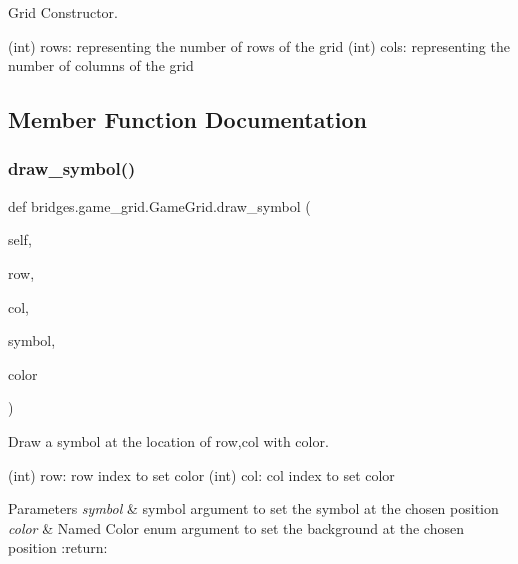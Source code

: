 Grid Constructor. 

(int) rows\+: representing the number of rows of the grid (int) cols\+: representing the number of columns of the grid 

\subsection{Member Function Documentation}
\mbox{\label{classbridges_1_1game__grid_1_1_game_grid_aa7ce48d090d75c8022a8356aafad303f}} 
\subsubsection{\texorpdfstring{draw\+\_\+symbol()}{draw\_symbol()}}
{\footnotesize\ttfamily def bridges.\+game\+\_\+grid.\+Game\+Grid.\+draw\+\_\+symbol (\begin{DoxyParamCaption}\item[{}]{self,  }\item[{}]{row,  }\item[{}]{col,  }\item[{}]{symbol,  }\item[{}]{color }\end{DoxyParamCaption})}



Draw a symbol at the location of row,col with color. 

(int) row\+: row index to set color (int) col\+: col index to set color 
\begin{DoxyParams}{Parameters}
{\em symbol} & symbol argument to set the symbol at the chosen position \\
\hline
{\em color} & Named Color enum argument to set the background at the chosen position \+:return\+: \\
\hline
\end{DoxyParams}
\mbox{\label{classbridges_1_1game__grid_1_1_game_grid_af99b99cdd5c487942ec15f5a5e5b208b}} 
